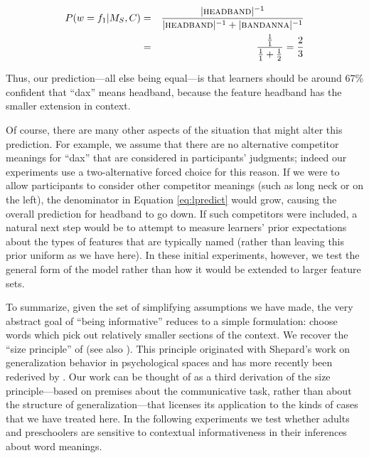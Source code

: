 \documentclass[review]{elsarticle}
\begin{document}
\begin{eqnarray*}
P(w = f_1 | M_S, C) &=& \frac{| \textsc{headband}|^{-1}}{| \textsc{headband}|^{-1} + | \textsc{bandanna}|^{-1}} \\
&=& \frac{\frac{1}{1}}{\frac{1}{1} + \frac{1}{2}} = \frac{2}{3} \\
\end{eqnarray*} 

\noindent Thus, our prediction---all else being equal---is that learners should be around 67\% confident that ``dax'' means {\sc headband}, because the feature {\sc headband} has the smaller extension in context. 

Of course, there are many other aspects of the situation that might alter this prediction. For example, we assume that there are no alternative competitor meanings for ``dax'' that are considered in participants' judgments; indeed our experiments use a two-alternative forced choice for this reason. If we were to allow participants to consider other competitor meanings (such as {\sc long neck} or {\sc on the left}), the denominator in Equation \ref{eq:lpredict} would grow, causing the overall prediction for {\sc headband} to go down. If such competitors were included, a natural next step would be to attempt to measure learners' prior expectations about the types of features that are typically named (rather than leaving this prior uniform as we have here). In these initial experiments, however, we test the general form of the model rather than how it would be extended to larger feature sets.

To summarize, given the set of simplifying assumptions we have made, the very abstract goal of ``being informative'' reduces to a simple formulation: choose words which pick out relatively smaller sections of the context. We recover the ``size principle'' of \citet{tenenbaum2002} (see also \citep{xu2007}). This principle originated with Shepard's \citeyear{shepard1987} work on generalization behavior in psychological spaces and  has more recently been rederived by \citet{navarro2009}. Our work can be thought of as a third derivation of the size principle---based on premises about the communicative task, rather than about the structure of generalization---that licenses its application to the kinds of cases that we have treated here. In the following experiments we test whether adults and preschoolers are sensitive to contextual informativeness in their inferences about word meanings.
\end{document}
